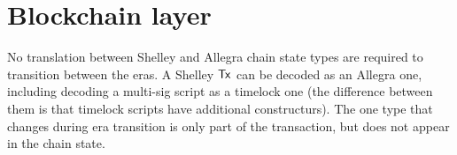 \section{Blockchain layer}
\label{sec:chain}

\newcommand{\Proof}{\type{Proof}}
\newcommand{\Seedl}{\mathsf{Seed}_\ell}
\newcommand{\Seede}{\mathsf{Seed}_\eta}
\newcommand{\activeSlotCoeff}[1]{\fun{activeSlotCoeff}~ \var{#1}}
\newcommand{\slotToSeed}[1]{\fun{slotToSeed}~ \var{#1}}

\newcommand{\T}{\type{T}}
\newcommand{\vrf}[3]{\fun{vrf}_{#1} ~ #2 ~ #3}
\newcommand{\verifyVrf}[4]{\fun{verifyVrf}_{#1} ~ #2 ~ #3 ~#4}

\newcommand{\HashHeader}{\type{HashHeader}}
\newcommand{\HashBBody}{\type{HashBBody}}
\newcommand{\bhHash}[1]{\fun{bhHash}~ \var{#1}}
\newcommand{\bHeaderSize}[1]{\fun{bHeaderSize}~ \var{#1}}
\newcommand{\bSize}[1]{\fun{bSize}~ \var{#1}}
\newcommand{\bBodySize}[1]{\fun{bBodySize}~ \var{#1}}
\newcommand{\OCert}{\type{OCert}}
\newcommand{\BHeader}{\type{BHeader}}
\newcommand{\BHBody}{\type{BHBody}}

\newcommand{\bheader}[1]{\fun{bheader}~\var{#1}}
\newcommand{\hsig}[1]{\fun{hsig}~\var{#1}}
\newcommand{\bprev}[1]{\fun{bprev}~\var{#1}}
\newcommand{\bhash}[1]{\fun{bhash}~\var{#1}}
\newcommand{\bvkcold}[1]{\fun{bvkcold}~\var{#1}}
\newcommand{\bseedl}[1]{\fun{bseed}_{\ell}~\var{#1}}
\newcommand{\bprfn}[1]{\fun{bprf}_{n}~\var{#1}}
\newcommand{\bseedn}[1]{\fun{bseed}_{n}~\var{#1}}
\newcommand{\bprfl}[1]{\fun{bprf}_{\ell}~\var{#1}}
\newcommand{\bocert}[1]{\fun{bocert}~\var{#1}}
\newcommand{\bnonce}[1]{\fun{bnonce}~\var{#1}}
\newcommand{\bleader}[1]{\fun{bleader}~\var{#1}}
\newcommand{\hBbsize}[1]{\fun{hBbsize}~\var{#1}}
\newcommand{\bbodyhash}[1]{\fun{bbodyhash}~\var{#1}}
\newcommand{\overlaySchedule}[4]{\fun{overlaySchedule}~\var{#1}~\var{#2}~{#3}~\var{#4}}

\newcommand{\PrtclState}{\type{PrtclState}}
\newcommand{\PrtclEnv}{\type{PrtclEnv}}
\newcommand{\OverlayEnv}{\type{OverlayEnv}}
\newcommand{\VRFState}{\type{VRFState}}
\newcommand{\NewEpochEnv}{\type{NewEpochEnv}}
\newcommand{\NewEpochState}{\type{NewEpochState}}
\newcommand{\PoolDistr}{\type{PoolDistr}}
\newcommand{\BBodyEnv}{\type{BBodyEnv}}
\newcommand{\BBodyState}{\type{BBodyState}}
\newcommand{\RUpdEnv}{\type{RUpdEnv}}
\newcommand{\ChainEnv}{\type{ChainEnv}}
\newcommand{\ChainState}{\type{ChainState}}
\newcommand{\ChainSig}{\type{ChainSig}}

No translation between Shelley and Allegra chain state types
are required to transition between the eras.
A Shelley $\mathsf{Tx}$ can be decoded as an Allegra one, including decoding a
multi-sig script as a timelock one (the difference between them
is that timelock scripts have additional constructurs).
The one type that changes during era transition is only part of the transaction,
but does not appear in the chain state.

